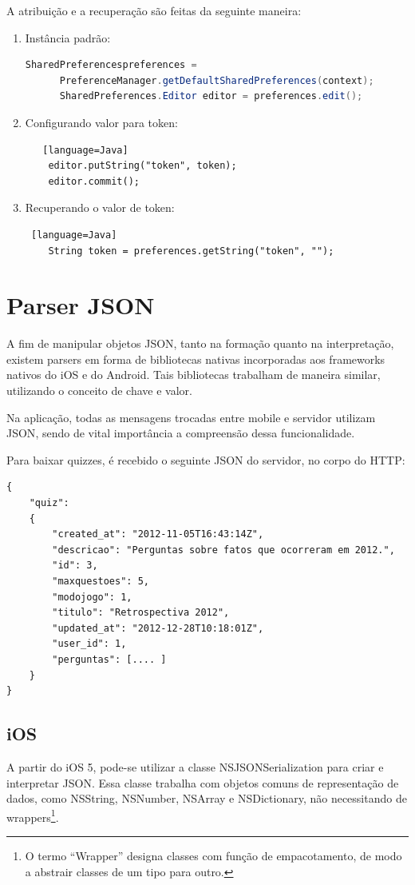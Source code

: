 	A atribuição e a recuperação são feitas da seguinte maneira:
\begin{enumerate}
\item Instância padrão:
  \begin{lstlisting}[language=Java]
      SharedPreferencespreferences = 
	  PreferenceManager.getDefaultSharedPreferences(context);
      SharedPreferences.Editor editor = preferences.edit();
  \end{lstlisting} 
     
\item Configurando valor para token:
\begin{lstlisting}   [language=Java]
    editor.putString("token", token);
    editor.commit();
 \end{lstlisting}       
\item Recuperando o valor de token:
\begin{lstlisting} [language=Java]
    String token = preferences.getString("token", "");
\end{lstlisting}   
\end{enumerate}     
     
    \section {Parser JSON}
     
            A fim de manipular objetos \ac{JSON}, tanto na formação quanto na interpretação, existem parsers em forma de bibliotecas nativas incorporadas aos frameworks nativos do iOS e do Android. Tais bibliotecas trabalham de maneira similar, utilizando o conceito de chave e valor.
            
			Na aplicação, todas as mensagens trocadas entre mobile e servidor utilizam \ac{JSON}, sendo de vital importância a compreensão dessa funcionalidade.
            
			Para baixar quizzes, é recebido o seguinte \ac{JSON} do servidor, no corpo do \ac{HTTP}:
\begin{lstlisting}   
{
    "quiz": 
    {
        "created_at": "2012-11-05T16:43:14Z",
        "descricao": "Perguntas sobre fatos que ocorreram em 2012.",
        "id": 3,
        "maxquestoes": 5,
        "modojogo": 1,
        "titulo": "Retrospectiva 2012",
        "updated_at": "2012-12-28T10:18:01Z",
        "user_id": 1,
        "perguntas": [.... ]
    }
}
     \end{lstlisting}   
    
	\subsection{iOS}
            A partir do iOS 5, pode-se utilizar a classe NSJSONSerialization para criar e interpretar \ac{JSON}. Essa classe trabalha com objetos comuns de representação de dados, como NSString, NSNumber, NSArray e NSDictionary, não necessitando de wrappers\footnote{O termo ``Wrapper'' designa classes com função de empacotamento, de modo a abstrair classes de um tipo para outro.}.
            
